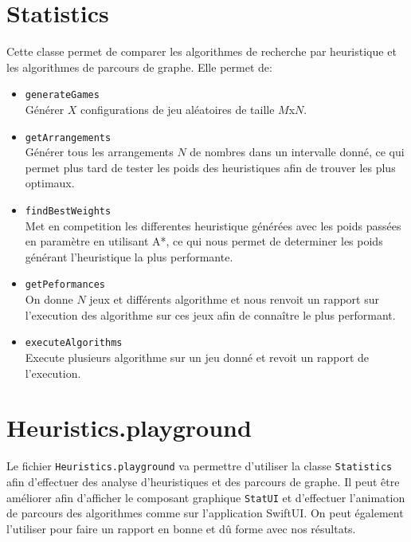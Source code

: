 \section{Statistics}
Cette classe permet de comparer les algorithmes de recherche par heuristique et les algorithmes de parcours de graphe. Elle permet de:
\begin{itemize}
      \item \texttt{generateGames} \\
            Générer $X$ configurations de jeu aléatoires de taille $M$x$N$.
      \item \texttt{getArrangements} \\
            Générer tous les arrangements $N$ de nombres dans un intervalle donné, ce qui permet plus tard de tester les poids des heuristiques afin de trouver les plus optimaux.
      \item \texttt{findBestWeights} \\
            Met en competition les differentes heuristique  générées avec les poids passées en paramètre en utilisant A*, ce qui nous permet de determiner les poids générant l'heuristique la plus performante.
      \item \texttt{getPeformances} \\
            On donne $N$ jeux et différents algorithme et nous renvoit un rapport sur l'execution des algorithme sur ces jeux afin de connaître le plus performant.
      \item \texttt{executeAlgorithms} \\
            Execute plusieurs algorithme sur un jeu donné et revoit un rapport de l'execution.
\end{itemize}

\section{Heuristics.playground}
Le fichier \texttt{Heuristics.playground} va permettre d'utiliser la classe \texttt{Statistics} afin d'effectuer des analyse d'heuristiques et des parcours de graphe. Il peut être améliorer afin d'afficher le composant graphique \texttt{StatUI} et d'effectuer l'animation de parcours des algorithmes comme sur l'application SwiftUI. On peut également l'utiliser pour faire un rapport en bonne et dû forme avec nos résultats.
